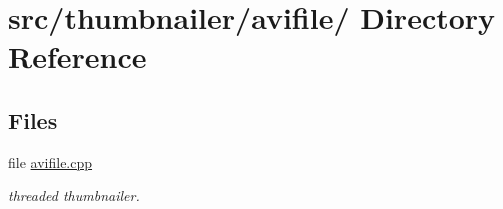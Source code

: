 \hypertarget{dir_000009}{
\section{src/thumbnailer/avifile/ Directory Reference}
\label{dir_000009}
}
\subsection*{Files}
\begin{CompactItemize}
\item 
file \hyperlink{avifile_8cpp}{avifile.cpp}
\begin{CompactList}\small\item\em threaded thumbnailer. \item\end{CompactList}

\end{CompactItemize}
